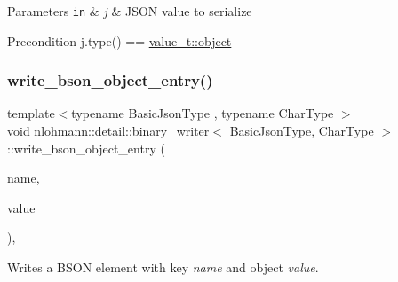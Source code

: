 \begin{DoxyParams}[1]{Parameters}
\mbox{\tt in}  & {\em j} & J\+S\+ON value to serialize \\
\hline
\end{DoxyParams}
\begin{DoxyPrecond}{Precondition}
j.\+type() == \hyperlink{namespacenlohmann_1_1detail_a1ed8fc6239da25abcaf681d30ace4985aa8cfde6331bd59eb2ac96f8911c4b666}{value\+\_\+t\+::object} 
\end{DoxyPrecond}
\mbox{\label{classnlohmann_1_1detail_1_1binary__writer_a6231302930265eccb3f56c378f7b0661}} 
\subsubsection{\texorpdfstring{write\+\_\+bson\+\_\+object\+\_\+entry()}{write\_bson\_object\_entry()}}
{\footnotesize\ttfamily template$<$typename Basic\+Json\+Type , typename Char\+Type $>$ \\
\hyperlink{namespacenlohmann_1_1detail_a59fca69799f6b9e366710cb9043aa77d}{void} \hyperlink{classnlohmann_1_1detail_1_1binary__writer}{nlohmann\+::detail\+::binary\+\_\+writer}$<$ Basic\+Json\+Type, Char\+Type $>$\+::write\+\_\+bson\+\_\+object\+\_\+entry (\begin{DoxyParamCaption}\item[{const \hyperlink{classnlohmann_1_1detail_1_1binary__writer_a29f2ae7a5c4a8c1dae47b3b2310de8a8}{string\+\_\+t} \&}]{name,  }\item[{const typename Basic\+Json\+Type\+::object\+\_\+t \&}]{value }\end{DoxyParamCaption})\hspace{0.3cm}{\ttfamily [inline]}, {\ttfamily [private]}}



Writes a B\+S\+ON element with key {\itshape name} and object {\itshape value}. 

\mbox{\label{classnlohmann_1_1detail_1_1binary__writer_a5e6574416915208fc035b57338ae3252}} 
